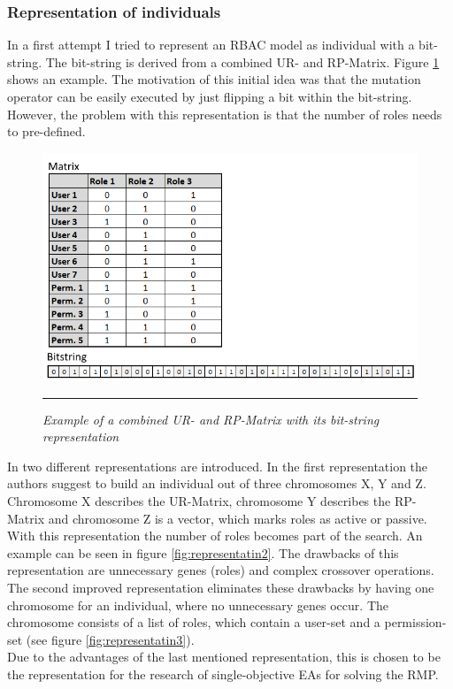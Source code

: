     \subsubsection{Representation of individuals}
    In a first attempt I tried to represent an RBAC model as individual with a bit-string. The bit-string is derived from a combined UR- and RP-Matrix. Figure \ref{fig:representation1} shows an example. The motivation of this initial idea was that the mutation operator can be easily executed by just flipping a bit within the bit-string. However, the problem with this representation is that the number of roles needs to pre-defined.\\
    \begin{figure}
        \centering
        \includegraphics[scale=0.75]{./Figures/Representation1.png}
        \rule{20em}{0.5pt}
        \caption{\textit{Example of a combined UR- and RP-Matrix with its bit-string representation}}
        \label{fig:representation1}
    \end{figure}
    In \cite{saenko2012design} two different representations are introduced. In the first representation the authors suggest to build an individual out of three chromosomes X, Y and Z. Chromosome X describes the UR-Matrix, chromosome Y describes the RP-Matrix and chromosome Z is a vector, which marks roles as active or passive. With this representation the number of roles becomes part of the search. An example can be seen in figure \ref{fig:representatin2}. The drawbacks of this representation are unnecessary genes (roles) and complex crossover operations\cite{saenko2012design}. The second improved representation eliminates these drawbacks by having one chromosome for an individual, where no unnecessary genes occur. The chromosome consists of a list of roles, which contain a user-set and a permission-set (see figure \ref{fig:representatin3}).\\
    Due to the advantages of the last mentioned representation, this is chosen to be the representation for the research of single-objective EAs for solving the RMP.

